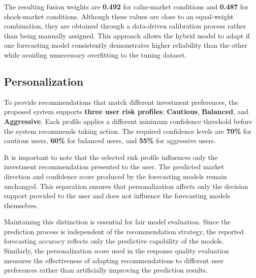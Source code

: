 The resulting fusion weights are \textbf{0.492} for calm-market
conditions and \textbf{0.487} for shock-market conditions. Although
these values are close to an equal-weight combination, they are obtained
through a data-driven calibration process rather than being manually
assigned. This approach allows the hybrid model to adapt if one
forecasting model consistently demonstrates higher reliability than the
other while avoiding unnecessary overfitting to the tuning dataset.

\subsection{Personalization}\label{sec:personalization}

To provide recommendations that match different investment preferences,
the proposed system supports \textbf{three user risk profiles}:
\textbf{Cautious}, \textbf{Balanced}, and \textbf{Aggressive}. Each
profile applies a different minimum confidence threshold before the
system recommends taking action. The required confidence levels are
\textbf{70\%} for cautious users, \textbf{60\%} for balanced users, and
\textbf{55\%} for aggressive users.

It is important to note that the selected risk profile influences only
the investment recommendation presented to the user. The predicted
market direction and confidence score produced by the forecasting models
remain unchanged. This separation ensures that personalization affects
only the decision support provided to the user and does not influence
the forecasting models themselves.

Maintaining this distinction is essential for fair model evaluation.
Since the prediction process is independent of the recommendation
strategy, the reported forecasting accuracy reflects only the predictive
capability of the models. Similarly, the personalization score used in
the response quality evaluation measures the effectiveness of adapting
recommendations to different user preferences rather than artificially
improving the prediction results.
